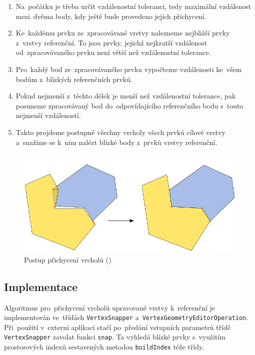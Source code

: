 \begin{enumerate}
 \item Na~počátku je třeba určit vzdálenostní toleranci, tedy maximální 
    vzdálenost mezi~dvěma body, kdy ještě bude provedeno jejich přichycení.
 \item Ke~každému prvku ze~zpracovávané vrstvy nalezneme nejbližší prvky 
    z~vrstvy referenční. To jsou prvky, jejichž nejkratší vzdálenost 
    od~zpracovávaného prvku není větší	než vzdálenostní tolerance.
 \item Pro~každý bod ze~zpracovávaného prvku vypočteme vzdálenosti ke~všem
    bodům z~blízkých referenčních prvků.
 \item Pokud nejmenší z~těchto délek je menší než vzdálenostní tolerance, 
    pak posuneme zpracovávaný bod do~odpovídajícího referenčního bodu s~touto
    nejmenší vzdáleností.
 \item Takto projdeme postupně všechny vrcholy všech prvků cílové vrstvy 
    a~snažíme se k~nim nalézt blízké body z~prvků vrstvy referenční. 
\end{enumerate}

\label{vspic}
  \begin{figure}[hbt]
    \centering
      \includegraphics[width=350pt]{./pictures/vs-princip.pdf}
      \caption{Postup přichycení vrcholů ()}
      \label{fig:vs-princip}
  \end{figure}

\subsection{Implementace} %
\label{vs-implementace}
Algoritmus pro~přichycení vrcholů upravované vrstvy k~referenční je 
implementován ve~třídách \texttt{Vertex\-Snapper} 
a~\texttt{Vertex\-Geometry\-Editor\-Operation}. Při~použití v~externí aplikaci 
stačí po~předání vstupních parametrů třídě \texttt{Vertex\-Snapper} zavolat 
funkci \texttt{snap}. Ta vyhledá blízké prvky s~využitím prostorových 
indexů sestavených metodou \texttt{build\-Index} téže třídy.

